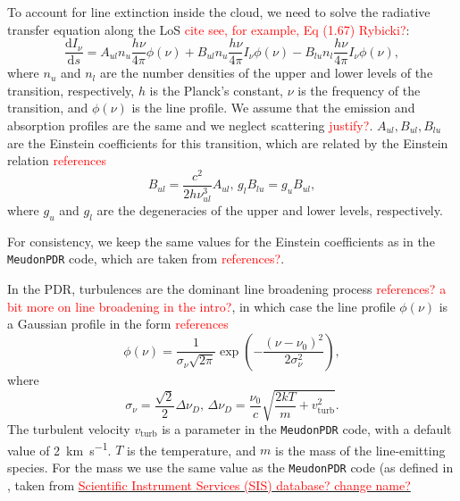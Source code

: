 \documentclass[12pt,a4paper]{article}
\newcommand{\mr}{\mathrm}
\newcommand{\fird}[2][]{\frac{\mathrm{d}#1}{\mathrm{d}#2}}
\newcommand{\mdpdr}{\texttt{MeudonPDR} code}
\newcommand{\qt}[1]{\textcolor{red}{#1}}
\begin{document}
To account for line extinction inside the cloud, we need to solve the radiative transfer equation along the LoS \qt{cite see, for example, Eq (1.67) Rybicki?}:
\begin{equation}
    \fird[I_\nu]{s} = A_{ul} n_u\frac{h\nu}{4\pi}\phi(\nu) +  B_{ul} n_u\frac{h\nu}{4\pi}I_\nu \phi(\nu) -  B_{lu} n_l\frac{h\nu}{4\pi}I_\nu \phi(\nu), \label{eq:rte}
\end{equation}  
where $n_u$ and $n_l$ are the number densities of the upper and lower levels of the transition, respectively, $h$ is the Planck's constant, $\nu$ is the frequency of the transition, and $\phi(\nu)$ is the line profile. We assume that the emission and absorption profiles are the same and we neglect scattering \qt{justify?}. $A_{ul}, B_{ul}, B_{lu}$ are the Einstein coefficients for this transition, which are related by the Einstein relation \qt{references}
\begin{equation}
    B_{ul} = \frac{c^2}{2 h \nu_{ul}^3} A_{ul},\, g_l B_{lu} = g_u B_{ul},
\end{equation}
where $g_u$ and $g_l$ are the degeneracies of the upper and lower levels, respectively.

For consistency, we keep the same values for the Einstein coefficients as in the \mdpdr{}, which are taken from \qt{references?}.

In the PDR, turbulences are the dominant line broadening process \qt{references?  a bit more on line broadening in the intro?}, in which case the line profile $\phi(\nu)$ is a Gaussian profile in the form \qt{references}
\begin{equation}
    \phi(\nu) = \frac{1}{\sigma_\nu \sqrt{2 \pi}}\exp\left({-\frac{(\nu - \nu_0)^2}{2 \sigma_\nu^2}}\right),
\end{equation}
where
\begin{equation}
    \sigma_\nu = \frac{\sqrt{2}}{2}\Delta \nu_D,\,\Delta \nu_D = \frac{\nu_0}{c}\sqrt{\frac{2 k T}{m} + v_\mr{turb}^2}.
\end{equation}
The turbulent velocity $v_\mr{turb}$ is a parameter in the \mdpdr{}, with a default value of \qty{2}{\km\per\second}. $T$ is the temperature, and $m$ is the mass of the line-emitting species. For the mass we use the same value as the \mdpdr{} (as defined in , taken from \href{https://www.sisweb.com/referenc/source/exactmas.htm}{\qt{Scientific Instrument Services (SIS) database? change name?}}
\end{document}
